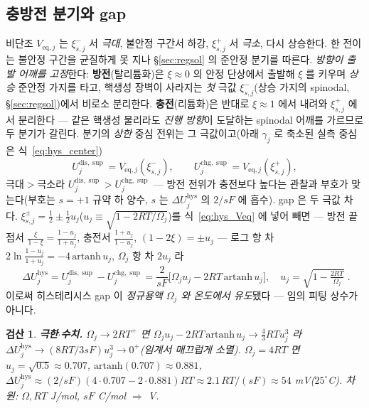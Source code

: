 \documentclass[11pt,a4paper]{article}
\newtheorem*{verifybox}{검산}
\newcommand{\eq}{\mathrm{eq}}
\newcommand{\dis}{\mathrm{dis}}
\newcommand{\chg}{\mathrm{chg}}
\newcommand{\hys}{\mathrm{hys}}
\begin{document}
\subsection{충방전 분기와 gap}
비단조 $V_{\eq,j}$ 는 $\xi_{s,j}^-$ 서 \emph{극대}, 불안정 구간서 하강, $\xi_{s,j}^+$ 서 \emph{극소}, 다시 상승한다.
한 전이는 불안정 구간을 균질하게 못 지나 \S\ref{sec:regsol} 의 준안정 분기를 따른다. \emph{방향이 출발 어깨를
고정}한다: \textbf{방전}(탈리튬화)은 $\xi\!\approx\!0$ 의 안정 단상에서 출발해 $\xi$ 를 키우며 \emph{상승} 준안정 가지를
타고, 핵생성 장벽이 사라지는 \emph{첫} 극값 $\xi_{s,j}^-$(상승 가지의 spinodal, \S\ref{sec:regsol})에서 비로소 분리한다.
\textbf{충전}(리튬화)은 반대로 $\xi\!\approx\!1$ 에서 내려와 $\xi_{s,j}^+$ 에서 분리한다 — 같은 핵생성 물리라도 \emph{진행
방향}이 도달하는 spinodal 어깨를 가르므로 두 분기가 갈린다. 분기의 \emph{상한} 중심 전위는 그 극값이고(아래
$\gamma_j$ 로 축소된 실측 중심은 식~\eqref{eq:hys_center})
\begin{equation}
U_j^{\dis,\sup}=V_{\eq,j}(\xi_{s,j}^-),\qquad U_j^{\chg,\sup}=V_{\eq,j}(\xi_{s,j}^+),
\label{eq:hys_branchU}
\end{equation}
극대$>$극소라 $U_j^{\dis,\sup}>U_j^{\chg,\sup}$ — 방전 전위가 충전보다 높다는 관찰과 부호가 맞는다(부호는 $s=+1$
규약 하 양수, $s$ 는 $\Delta U_j^\hys$ 의 $2/sF$ 에 흡수). gap 은 두 극값 차다.
$\xi_{s,j}^\pm=\tfrac12\pm\tfrac12 u_j$($u_j\equiv\sqrt{1-2RT/\Omega_j}$)를 식~\eqref{eq:hys_Veq} 에 넣어 빼면 —
방전 끝점서 $\tfrac{\xi}{1-\xi}=\tfrac{1-u_j}{1+u_j}$, 충전서 $\tfrac{1+u_j}{1-u_j}$, $(1-2\xi)=\pm u_j$ — 로그 항
차 $2\ln\tfrac{1-u_j}{1+u_j}=-4\,\mathrm{artanh}\,u_j$, $\Omega_j$ 항 차 $2u_j$ 라
\begin{equation}
\boxed{\;\Delta U_j^\hys=U_j^{\dis,\sup}-U_j^{\chg,\sup}=\frac{2}{sF}\big[\Omega_j u_j-2RT\,\mathrm{artanh}\,u_j\big],\quad
u_j=\sqrt{1-\tfrac{2RT}{\Omega_j}}\;.}
\label{eq:hys_dU}
\end{equation}
이로써 히스테리시스 gap 이 \emph{정규용액 $\Omega_j$ 와 온도에서 유도}됐다 — 임의 피팅 상수가 아니다.
\begin{verifybox}
\textbf{극한$\cdot$수치.} $\Omega_j\to2RT^+$ 면 $\Omega_j u_j-2RT\,\mathrm{artanh}\,u_j\to\tfrac43RT u_j^3$ 라
$\Delta U_j^\hys\to(8RT/3sF)u_j^3\to0^+$(임계서 매끄럽게 소멸). $\Omega_j=4RT$ 면 $u_j=\sqrt{0.5}\approx0.707$,
$\mathrm{artanh}(0.707)\approx0.881$, $\Delta U_j^\hys\approx(2/sF)(4{\cdot}0.707-2{\cdot}0.881)RT\approx2.1\,RT/(sF)
\approx54$ mV($25^\circ$C). 차원: $\Omega,RT$ J/mol, $sF$ C/mol $\Rightarrow$ V.
\end{verifybox}
\end{document}

